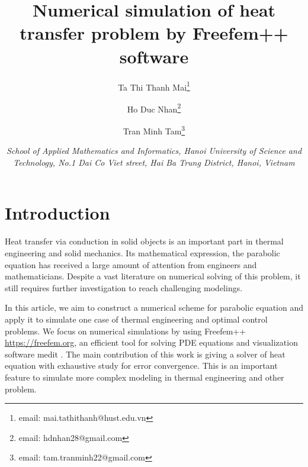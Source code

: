 \documentclass[twocolumn]{article}
\title{\bf Numerical simulation of heat transfer problem by Freefem++ software}
\author{Ta Thi Thanh Mai\thanks{email: mai.tathithanh@hust.edu.vn}\and Ho Duc Nhan\thanks{email: hdnhan28@gmail.com}\and Tran Minh Tam\thanks{email: tam.tranminh22@gmail.com}}
\date{\footnotesize\textit{School of Applied Mathematics and Informatics, Hanoi University of Science and Technology, No.1 Dai Co Viet street, Hai Ba Trung District, Hanoi, Vietnam}}
\begin{document}
\saythanks

\section{Introduction}
\quad Heat transfer via conduction in solid objects is an important part in thermal engineering and solid mechanics. Its mathematical expression, the parabolic equation has received a large amount of attention from engineers and mathematicians. Despite a vast literature on numerical solving of this problem, it still requires further investigation to reach challenging modelings. 

In this article, we aim to construct a numerical scheme for parabolic equation and apply it to simulate one case of thermal engineering and optimal control problems. We focus on numerical simulations by using Freefem++ \url{https://freefem.org}, an efficient tool for solving PDE equations and visualization software medit \cite{Fre01}. The main contribution of this work is giving a solver of heat equation with exhaustive study for error convergence. This is an important feature to simulate more complex modeling in thermal engineering and other problem.
\end{document}
